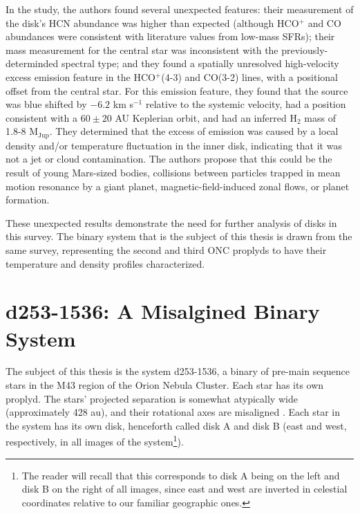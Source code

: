 In the study, the authors found several unexpected features: their measurement of the disk's HCN abundance was higher than expected (although HCO$^+$ and CO abundances were consistent with literature values from low-mass SFRs); their mass measurement for the central star was inconsistent with the previously-determinded spectral type; and they found a spatially unresolved high-velocity excess emission feature in the HCO$^+$(4-3) and CO(3-2) lines, with a positional offset from the central star. For this emission feature, they found that the source was blue shifted by $-6.2$ km s$^{-1}$ relative to the systemic velocity, had a position consistent with a $60\pm20$ AU Keplerian orbit, and had an inferred H$_2$ mass of 1.8-8 M$_\text{Jup}$. They determined that the excess of emission was caused by a local density and/or temperature fluctuation in the inner disk, indicating that it was not a jet or cloud contamination. The authors propose that this could be the result of young Mars-sized bodies, collisions between particles trapped in mean motion resonance by a giant planet, magnetic-field-induced zonal flows, or planet formation.


These unexpected results demonstrate the need for further analysis of disks in this survey. The binary system that is the subject of this thesis is drawn from the same survey, representing the second and third ONC proplyds to have their temperature and density profiles characterized.





\section{d253-1536: A Misalgined Binary System}

The subject of this thesis is the system d253-1536, a binary of pre-main sequence stars in the M43 region of the Orion Nebula Cluster. Each star has its own proplyd. The stars' projected separation is somewhat atypically wide (approximately 428 au), and their rotational axes are misaligned \citep{Williams2014}. Each star in the system has its own disk, henceforth called disk A and disk B (east and west, respectively, in all images of the system\footnote{The reader will recall that this corresponds to disk A being on the left and disk B on the right of all images, since east and west are inverted in celestial coordinates relative to our familiar geographic ones.}).

